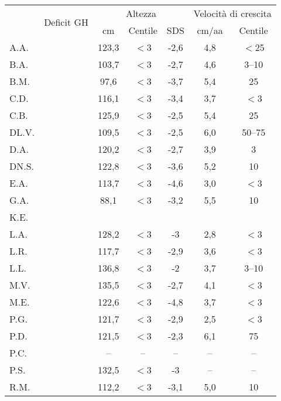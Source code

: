 \begin{table}[!h]
\begin{center}
\addtolength{\tabcolsep}{5pt}
\renewcommand{\arraystretch}{1.1}
\begin{tabular}{lcccccc}
\toprule
 & \multirow{2}{*}{Deficit GH} & \multicolumn{3}{c}{Altezza} & \multicolumn{2}{c}{Velocità di crescita} \\
 \cmidrule(r){3-5}  \cmidrule(r){6-7}
 &    							& cm & Centile  & SDS & cm/aa & Centile \\
A.A.	&  				 		& 123,3 & $<$3  & -2,6 & 4,8 & $<$25  \\
B.A.	& \checkmark 	  				& 103,7 & $<$3  & -2,7 & 4,6 & 3--10   \\
B.M.	& \checkmark 	  				&  97,6 & $<$3  & -3,7 & 5,4 & 25     \\
C.D.	& \checkmark 	  				& 116,1 & $<$3  & -3,4 & 3,7 & $<$3   \\
C.B.	&  				 	        & 125,9 & $<$3  & -2,5 & 5,4 & 25     \\
DL.V.	& \checkmark 	  				& 109,5 & $<$3  & -2,5 & 6,0 & 50--75  \\
D.A.	&  				  		& 120,2 & $<$3  & -2,7 & 3,9 & 3      \\
DN.S.	& \checkmark 	  				& 122,8 & $<$3  & -3,6 & 5,2 & 10     \\
E.A.	&  				  		& 113,7 & $<$3  & -4,6 & 3,0 & $<$3   \\
G.A.	&  				  		&  88,1 & $<$3  & -3,2 & 5,5 & 10     \\
K.E.	&  				  		&       &       &      &     &    \\
L.A.	& \checkmark 	  				& 128,2 & $<$3  & -3   & 2,8 & $<$3   \\
L.R.	&  				  		& 117,7 & $<$3  & -2,9 & 3,6 & $<$3   \\
L.L.	&  				  		& 136,8 & $<$3  & -2   & 3,7 & 3--10   \\
M.V.	& \checkmark 	  				& 135,5 & $<$3  & -2,7 & 4,1 & $<$3   \\
M.E.	&  				  		& 122,6 & $<$3  & -4,8 & 3,7 & $<$3   \\
P.G.	& \checkmark 	  				& 121,7 & $<$3  & -2,9 & 2,5 & $<$3   \\
P.D.	&  				  		& 121,5 & $<$3  & -2,3 & 6,1 & 75     \\
P.C.	&  				  		& --    & --    & --   & --  & --     \\
P.S.	&  				  		& 132,5 & $<$3  & -3   & --  & --     \\
R.M.	& \checkmark 	  				& 112,2 & $<$3  & -3,1 & 5,0 & 10     \\

\end{tabular}
\end{center}
\end{table}

